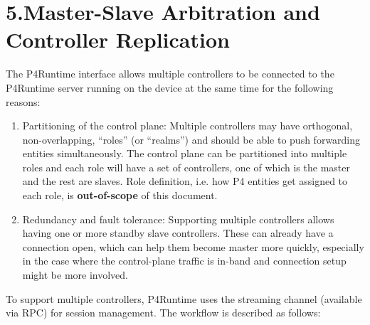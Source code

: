\documentclass[11pt]{article}
\begin{document}
{%
\section{5.\hspace*{0.5em}Master-Slave Arbitration and Controller Replication}\label{sec-master-slave-arbitration-and-controller-replication}%

\noindent{}The P4Runtime interface allows multiple controllers to be connected to the
P4Runtime server running on the device at the same time for the following
reasons:%

\begin{enumerate}%

\item{}
Partitioning of the control plane: Multiple controllers may have orthogonal,
non-overlapping, \textquotedblleft{}roles\textquotedblright{} (or \textquotedblleft{}realms\textquotedblright{}) and should be able to push forwarding
entities simultaneously. The control plane can be partitioned into multiple
roles and each role will have a set of controllers, one of which is the
master and the rest are slaves. Role definition, i.e. how P4 entities get
assigned to each role, is \textbf{out-of-scope} of this document.%

\item{}
Redundancy and fault tolerance: Supporting multiple controllers allows having
one or more standby slave controllers. These can already have a connection
open, which can help them become master more quickly, especially in the case
where the control-plane traffic is in-band and connection setup might be more
involved.%
\end{enumerate}%

\noindent{}To support multiple controllers, P4Runtime uses the streaming channel (available
via  RPC) for session management. The workflow is described as
follows:%

\begin{itemize}%


\end{itemize}}
\end{document}
